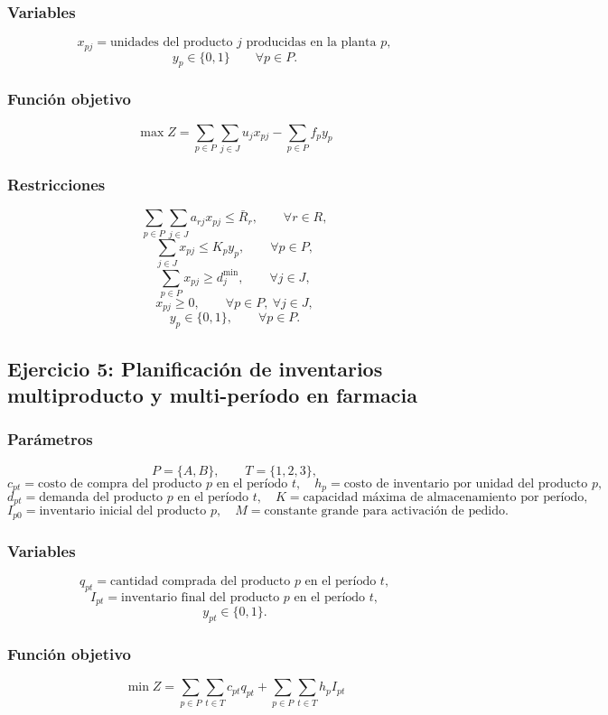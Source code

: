 \documentclass[12pt,letterpaper]{article}
\begin{document}
\subsubsection*{Variables}
\[
x_{pj}=\text{unidades del producto } j \text{ producidas en la planta } p,
\]
\[
y_p\in\{0,1\}\qquad \forall p\in P.
\]

\subsubsection*{Función objetivo}
\[
\max Z=\sum_{p\in P}\sum_{j\in J}u_j x_{pj}-\sum_{p\in P}f_p y_p
\]

\subsubsection*{Restricciones}
\[
\sum_{p\in P}\sum_{j\in J}a_{rj}x_{pj}\le \bar{R}_r,\qquad \forall r\in R,
\]
\[
\sum_{j\in J}x_{pj}\le K_p y_p,\qquad \forall p\in P,
\]
\[
\sum_{p\in P}x_{pj}\ge d_j^{\min},\qquad \forall j\in J,
\]
\[
x_{pj}\ge 0,\qquad \forall p\in P,\ \forall j\in J,
\]
\[
y_p\in\{0,1\},\qquad \forall p\in P.
\]

\subsection{Ejercicio 5: Planificación de inventarios multiproducto y multi-período en farmacia}

\subsubsection*{Parámetros}
\[
P=\{A,B\},\qquad T=\{1,2,3\},
\]
\[
c_{pt}=\text{costo de compra del producto } p \text{ en el período } t,\quad
h_p=\text{costo de inventario por unidad del producto } p,
\]
\[
d_{pt}=\text{demanda del producto } p \text{ en el período } t,\quad
K=\text{capacidad máxima de almacenamiento por período},
\]
\[
I_{p0}=\text{inventario inicial del producto } p,\quad
M=\text{constante grande para activación de pedido}.
\]

\subsubsection*{Variables}
\[
q_{pt}=\text{cantidad comprada del producto } p \text{ en el período } t,
\]
\[
I_{pt}=\text{inventario final del producto } p \text{ en el período } t,
\]
\[
y_{pt}\in\{0,1\}.
\]

\subsubsection*{Función objetivo}
\[
\min Z=\sum_{p\in P}\sum_{t\in T}c_{pt}q_{pt}+\sum_{p\in P}\sum_{t\in T}h_pI_{pt}
\]
\end{document}
